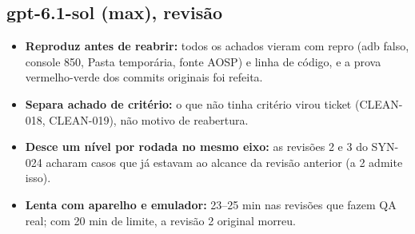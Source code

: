 \documentclass[11pt,a4paper]{article}
\begin{document}
\subsection*{gpt-6.1-sol (max), revisão}
\begin{itemize}
  \item \textbf{Reproduz antes de reabrir:} todos os achados vieram com repro
        (adb falso, console 850, Pasta temporária, fonte AOSP) e linha de
        código, e a prova vermelho-verde dos commits originais foi refeita.
  \item \textbf{Separa achado de critério:} o que não tinha critério virou
        ticket (CLEAN-018, CLEAN-019), não motivo de reabertura.
  \item \textbf{Desce um nível por rodada no mesmo eixo:} as revisões 2 e 3 do
        SYN-024 acharam casos que já estavam ao alcance da revisão anterior (a
        2 admite isso).
  \item \textbf{Lenta com aparelho e emulador:} 23--25 min nas revisões que
        fazem QA real; com 20 min de limite, a revisão 2 original morreu.
\end{itemize}
\end{document}
